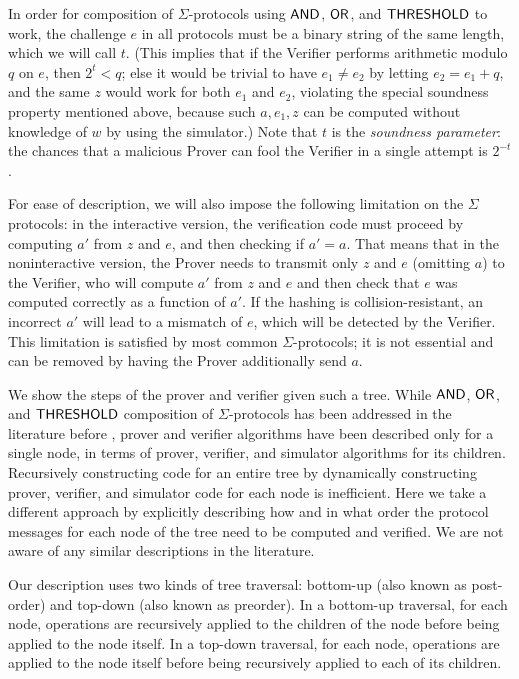 \documentclass[11pt]{llncs}
\begin{document}
In order for composition of $\Sigma$-protocols using $\mathsf{AND}$, $\mathsf{OR}$, and $\mathsf{THRESHOLD}$ to work, the challenge $e$ in all protocols must be a binary string of the same length, which we will call $t$.  (This implies that if the Verifier performs arithmetic modulo $q$ on $e$, then $2^t<q$; else it would be trivial to have $e_1\neq e_2$ by letting $e_2=e_1+q$, and the same $z$ would work for both $e_1$ and $e_2$, violating the special soundness property mentioned above, because such $a, e_1, z$ can be computed without knowledge of $w$ by using the simulator.)  Note that $t$ is the \emph{soundness parameter}: the chances that a malicious Prover can fool the Verifier in a single attempt is $2^{-t}$. 

 For ease of description, we will also impose the following limitation on the $\Sigma$ protocols: in the interactive version, the verification code must proceed by computing $a'$ from $z$ and $e$, and then checking if $a'=a$. That means that in the noninteractive version, the Prover needs to transmit only $z$ and $e$ (omitting $a$) to the Verifier, who will compute $a'$ from $z$ and $e$ and then check that $e$ was computed correctly as a function of $a'$. If the hashing is collision-resistant, an incorrect $a'$ will lead to a mismatch of $e$, which will be detected by the Verifier. This limitation is satisfied by most common $\Sigma$-protocols; it is not essential and can be removed by having the Prover additionally send $a$.

We show the steps of the prover and verifier given such a tree. While $\mathsf{AND}$, $\mathsf{OR}$, and $\mathsf{THRESHOLD}$ composition of $\Sigma$-protocols has been addressed in the literature before \cite{CDS94}, prover and verifier algorithms have been described only for a single node, in terms of prover, verifier, and simulator algorithms for its children. Recursively constructing code for an entire tree by dynamically constructing prover, verifier, and simulator code for each node is inefficient. Here we take a different approach by explicitly describing how and in what order the protocol messages for each node of the tree need to be computed and verified. We are not aware of any similar descriptions in the literature.

Our description uses two kinds of tree traversal: bottom-up (also known as post-order) and top-down (also known as preorder). In a bottom-up traversal, for each node, operations are recursively applied to the children of the node before being applied to the node itself. In a top-down traversal, for each node, operations are applied to the node itself before being recursively applied to each of its children.
\end{document}
